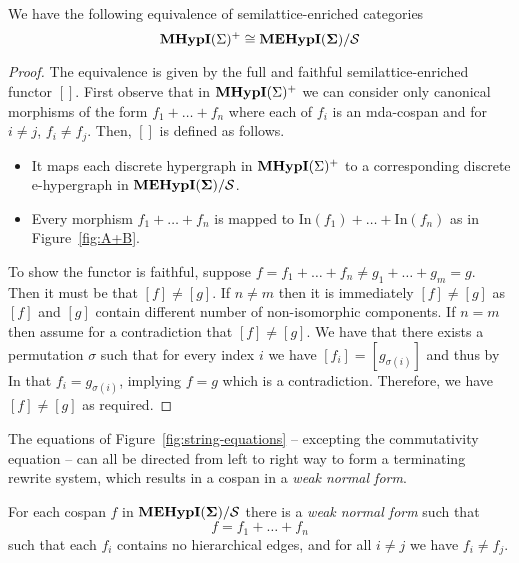 \begin{lemma}
We have the following equivalence of semilattice-enriched categories
\[
\textbf{MHypI}(\Sigma)^{+} \cong {\mathbf{MEHypI(\Sigma)}}/\mathcal{S}
\]
\end{lemma}
\begin{proof}
The equivalence is given by the full and faithful semilattice-enriched functor $[]$.
First observe that in $\textbf{MHypI}(\Sigma)^{+}$ we can consider only canonical morphisms of the form $f_{1} + \ldots + f_{n}$ where each of $f_{i}$ is an mda-cospan and for $i \not = j$, $f_{i} \not = f_{j}$.
Then, $[]$ is defined as follows.
\begin{itemize}
\item It maps each discrete hypergraph in $\textbf{MHypI}(\Sigma)^{+}$ to a corresponding discrete e-hypergraph in ${\mathbf{MEHypI(\Sigma)}}/\mathcal{S}$.
\item Every morphism $f_{1} + \ldots + f_{n}$ is mapped to $\text{In}(f_{1}) + \ldots + \text{In}(f_{n})$ as in Figure~\ref{fig:A+B}.
\end{itemize}
To show the functor is faithful, suppose $f = f_{1} + \ldots + f_{n} \not = g_{1} + \ldots + g_{m} = g$.
Then it must be that $[f] \not = [g]$.
If $n \not = m$ then it is immediately $[f] \not = [g]$ as $[f]$ and $[g]$ contain different number of non-isomorphic components.
If $n = m$ then assume for a contradiction that $[f] \not = [g]$. 
We have that there exists a permutation $\sigma$ such that for every index $i$ we have $[f_{i}] = [g_{\sigma(i)}]$ and thus by $\text{In}$ that $f_{i} = g_{\sigma(i)}$, implying $f = g$ which is a contradiction.
Therefore, we have $[f] \not = [g]$ as required.
\end{proof}

The equations of Figure~\ref{fig:string-equations} -- excepting the commutativity equation -- can all be directed from left to right way to form a terminating rewrite system,  which results in a cospan in a \textit{weak normal form}. 
\begin{proposition}
\label{prop:wnormal_form}
For each cospan $f$ in ${{\mathbf{MEHypI(\Sigma)}}}/{\mathcal{S}}$ there is a \textit{weak normal form} such that 
\[
	f = f_1 + \ldots + f_n
\]
 such that each $f_i$ contains no hierarchical edges,  and for all $i \neq j$ we have $f_i \neq f_j$.
\end{proposition}


